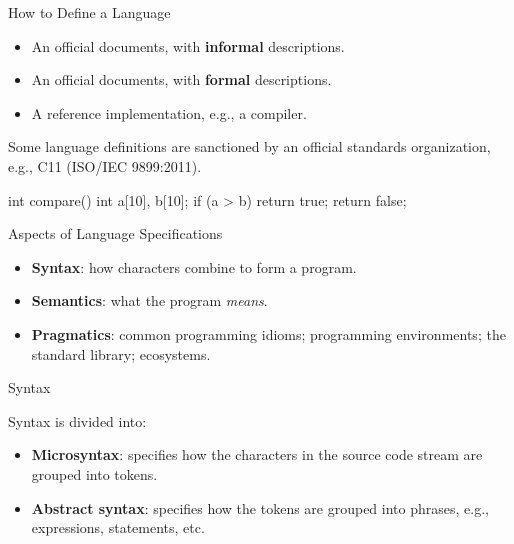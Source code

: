 \documentclass{plt}
\begin{document}
\begin{frame}[fragile]{How to Define a Language}

\begin{itemize}

\item An official documents, with \textbf{informal} descriptions.

\item An official documents, with \textbf{formal} descriptions.

\item A reference implementation, e.g., a compiler.
\end{itemize}
Some language definitions are sanctioned by an official standards organization, e.g.,
C11 (ISO/IEC 9899:2011).

\begin{center}
\begin{C}
int compare()
{
  int a[10], b[10]; 
  if (a > b)
    return true;
  return false;
}
\end{C}
\end{center}
\end{frame}


\begin{frame}[fragile]{Aspects of Language Specifications}

\begin{center}
\end{center}

\begin{itemize}

\item \textbf{Syntax}: how characters combine to form a program.

\item \textbf{Semantics}: what the program \emph{means}.

\item \textbf{Pragmatics}: common programming idioms; programming environments;
the standard library; ecosystems.

\end{itemize}


\end{frame}


\begin{frame}{Syntax}

Syntax is divided into:
\begin{itemize}
\item  \textbf{Microsyntax}: specifies how the characters in the source code stream are grouped into tokens.
\item \textbf{Abstract syntax}: specifies how the tokens are grouped into phrases, e.g., expressions, statements, etc.
\end{itemize}

\end{frame}
\end{document}

